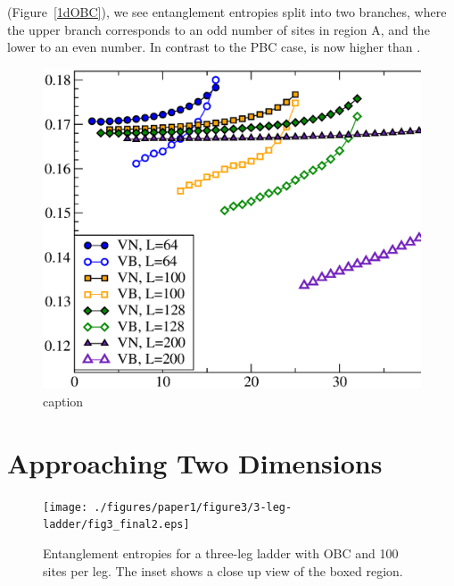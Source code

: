  (Figure~\ref{1dOBC}), we see entanglement entropies split into two branches, where the upper branch corresponds to an odd number of sites in region A, and the lower to an even number.
In contrast to the PBC case, \vb is now higher than \vn.

\begin{figure} {
\includegraphics[width=6.5in]{./figures/paper1/figure1/fig2_NEW.eps} 
\centering
\caption[caption]{ 
	caption
}}
\end{figure}


\section{Approaching Two Dimensions}

 
\begin{figure} { \texttt{[image: ./figures/paper1/figure3/3-leg-ladder/fig3\_final2.eps]}
\caption[Entanglement entropies for a three-leg ladder]{
Entanglement entropies for a three-leg ladder with OBC and 100 sites per leg.  
The inset shows a close up view of the boxed region.
 \label{ladder3} }} 
 \end{figure}
 
